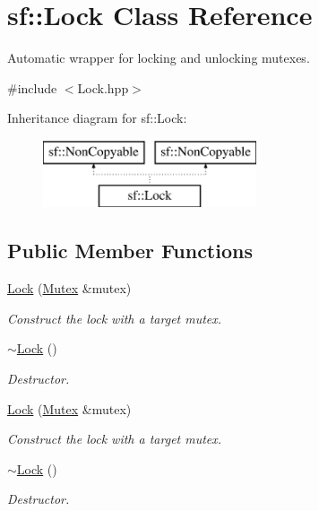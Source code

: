 \hypertarget{classsf_1_1_lock}{\section{sf\-:\-:Lock Class Reference}
\label{classsf_1_1_lock}
}


Automatic wrapper for locking and unlocking mutexes.  




{\ttfamily \#include $<$Lock.\-hpp$>$}

Inheritance diagram for sf\-:\-:Lock\-:\begin{figure}[H]
\begin{center}
\leavevmode
\includegraphics[height=2.000000cm]{classsf_1_1_lock}
\end{center}
\end{figure}
\subsection*{Public Member Functions}
\begin{DoxyCompactItemize}
\item 
\hyperlink{classsf_1_1_lock_a1a4c5d7a15da61103d85c9aa7f118920}{Lock} (\hyperlink{classsf_1_1_mutex}{Mutex} \&mutex)
\begin{DoxyCompactList}\small\item\em Construct the lock with a target mutex. \end{DoxyCompactList}\item 
\hyperlink{classsf_1_1_lock_a8168b36323a18ccf5b6bc531d964aec5}{$\sim$\-Lock} ()
\begin{DoxyCompactList}\small\item\em Destructor. \end{DoxyCompactList}\item 
\hyperlink{classsf_1_1_lock_a1a4c5d7a15da61103d85c9aa7f118920}{Lock} (\hyperlink{classsf_1_1_mutex}{Mutex} \&mutex)
\begin{DoxyCompactList}\small\item\em Construct the lock with a target mutex. \end{DoxyCompactList}\item 
\hyperlink{classsf_1_1_lock_a8168b36323a18ccf5b6bc531d964aec5}{$\sim$\-Lock} ()
\begin{DoxyCompactList}\small\item\em Destructor. \end{DoxyCompactList}\end{DoxyCompactItemize}



